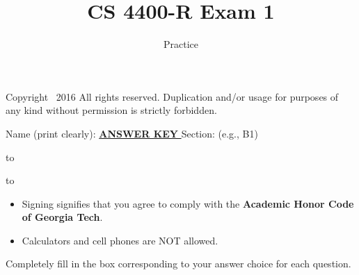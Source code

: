 \documentclass[9pt]{exam}
\title{CS 4400-R Exam 1}
\date{Practice}
\begin{document}
\maketitle
\thispagestyle{head}


\runningheader{}
              {\tiny Copyright \textcopyright\ 2016 All rights reserved. Duplication and/or usage for purposes of any kind without permission is strictly forbidden.}
              {}




\vspace{0.1in}

Name (print clearly): \ifprintanswers \underline{  {\bf ANSWER KEY}  } \fi \hrulefill Section: (e.g., B1) \makebox[.5in]{\hrulefill}

\vspace{0.25in}
\hbox to \textwidth{Signature: \hrulefill}

\vspace{0.25in}
\hbox to \textwidth{GT account username (gtg, gth, msmith3, etc): \enspace\hrulefill}

\vfill

\begin{itemize}
\item Signing signifies that you agree to comply with the {\bf Academic Honor Code of Georgia Tech}.
\item Calculators and cell phones are NOT allowed.
\end{itemize}



Completely fill in the box corresponding to your answer choice for each question.
\end{document}
